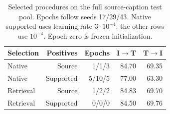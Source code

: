 \begin{table}[!b]
\nolinenumbers
\centering
\setlength{\tabcolsep}{3pt}
\begin{tabular}{lrrrr}
\toprule
Selection & Positives & Epochs & I$\to$T & T$\to$I\\
\midrule
Native & Source & 1/1/3 & 84.70 & 69.35\\
Native & Supported & 5/10/5 & 77.00 & 63.30\\
Retrieval & Source & 1/2/2 & 84.83 & 69.70\\
Retrieval & Supported & 0/0/0 & 84.50 & 69.76\\
\bottomrule
\end{tabular}
\caption{Selected procedures on the full source-caption test pool. Epochs follow seeds 17/29/43. Native supported uses learning rate $3\cdot10^{-4}$; the other rows use $10^{-4}$. Epoch zero is frozen initialization.}\label{tab:selection}
\end{table}
